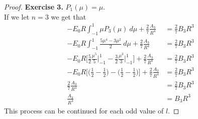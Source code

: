\documentclass[11pt]{article}
\theoremstyle{definition}
\begin{document}
\begin{proof}{\textbf{Exercise 3.}}
$P_1(\mu) = \mu$.
\\
If we let $n = 3$ we get that
\begin{align*}
    -E_0R\int_{-1}^1\mu P_3(\mu)~d\mu + \frac{2}{7}\frac{A_3}{R^{4}}
    &= \frac{2}{7}B_3R^3\\
    -E_0R\int_{-1}^1 \frac{5\mu^4 - 3\mu^2}{2}~d\mu
    + \frac{2}{7}\frac{A_3}{R^{4}}
    &= \frac{2}{7}B_3R^3\\
    -E_0R\bigg[\frac{5}{2}\frac{\mu^5}{5}\bigg|_{-1}^1
    - \frac{3}{2}\frac{\mu^3}{3}\bigg|_{-1}^1\bigg]
    + \frac{2}{7}\frac{A_3}{R^{4}}
    &= \frac{2}{7}B_3R^3\\
    -E_0R\bigg[\bigg(\frac{1}{2} - \frac{1}{2}\bigg)
    - \bigg(\frac{1}{2} - \frac{1}{2}\bigg)\bigg]
    + \frac{2}{7}\frac{A_3}{R^{4}}
    &= \frac{2}{7}B_3R^3\\
    \frac{2}{7}\frac{A_3}{R^{4}}
    &= \frac{2}{7}B_3R^3\\
    \frac{A_3}{R^{4}}
    &= B_3R^3
\end{align*}
This process can be continued for each odd value of $l$.
\end{proof}
\end{document}
